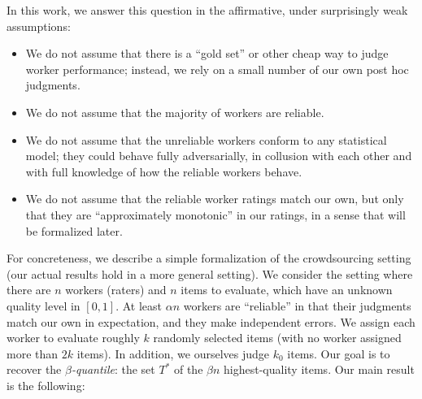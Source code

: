 \iffalse

In this work, we take a different perspective: we make no restrictions on the content that people can produce, and instead focus on \emph{evaluating} this 
content, using human ratings to achieve scalability in this evaluation task. 
For instance, in a crowdsourcing setting where we wanted to translate paragraphs 
from Chinese to English, we would first ask workers to perform the translation, 
and then ask a (potentially) new set of workers to evaluate the quality of 
the translations.   

This leads to several challenges. First, many workers may be unreliable; 
second, some reliable raters might be harsher or more lenient than others; 
third, some translations may be harder to evaluate than others 
and so rater error rates could vary from item to item; 
finally, some workers may even collude. %
Despite these difficulties, though, at least some workers 
actually are reliable. This raises the question: can we obtain 
information from the reliable workers, without knowing who they are a priori?
\fi

In this work, we answer this question in the affirmative, under surprisingly 
weak assumptions:
\begin{itemize}
\item We do not assume that there is a ``gold set'' or other cheap way to judge 
      worker performance; instead, we rely on a small number of our own post hoc judgments.
\item We do not assume that the majority of workers are reliable.
\item We do not assume that the unreliable workers conform to any statistical 
      model; they could behave fully adversarially, in collusion with each other 
      and with full knowledge of how the reliable workers behave.
\item We do not assume that the reliable worker ratings match our own, but only that they are 
      ``approximately monotonic'' in our ratings, in a sense that will be 
      formalized later.
\end{itemize}
For concreteness, we describe a simple formalization of the crowdsourcing 
setting (our actual results hold in a more general setting). We consider the setting where 
there are $n$ workers (raters) and $n$ items to evaluate, which have an unknown 
quality level in $[0,1]$. At least $\alpha n$ workers are ``reliable'' in that 
their judgments match our own in expectation, and they make independent errors.
We assign each worker to evaluate roughly $k$ randomly selected items (with no worker assigned more than $2k$ items). In addition, we ourselves judge $k_0$ items. Our goal is to 
recover the \emph{$\beta$-quantile}: the set $T^*$ of the $\beta n$ highest-quality items. 
Our main result is the following:

